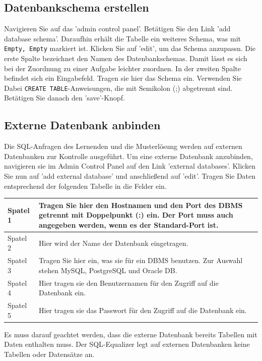 \documentclass[12pt]{scrreprt}
\theoremstyle{remark}
\begin{document}
\subsection{Datenbankschema erstellen}

Navigieren Sie auf das 'admin control panel'. Betätigen Sie den Link 'add database schema'. Daraufhin erhält die Tabelle ein weiteres Schema, was mit \verb|Empty, Empty| markiert ist. Klicken Sie auf 'edit', um das Schema anzupassn. Die erste Spalte bezeichnet den Namen des Datenbankschemas. Damit lässt es sich bei der Zuordnung zu einer Aufgabe leichter zuordnen. In der zweiten Spalte befindet sich ein Eingabefeld. Tragen sie hier das Schema ein. Verwenden Sie Dabei \verb|CREATE TABLE|-Anweisungen, die mit Semikolon (;) abgetrennt sind. Betätigen Sie danach den 'save'-Knopf.

\subsection{Externe Datenbank anbinden}

Die SQL-Anfragen des Lernenden und die Musterlösung werden auf externen Datenbanken zur Kontrolle ausgeführt. Um eine externe Datenbank anzubinden, navigieren sie im Admin Control Panel auf den Link 'external databases'. Klicken Sie nun auf 'add external database' und anschließend auf 'edit'.  Tragen Sie Daten entsprechend der folgenden Tabelle in die Felder ein.

\begin{tabular}{|l|p{14cm}|}\hline
Spatel 1 & Tragen Sie hier den Hostnamen und den Port des DBMS getrennt mit Doppelpunkt (:) ein. Der Port muss auch angegeben werden, wenn es der Standard-Port ist.\\\hline
Spatel 2 & Hier wird der Name der Datenbank eingetragen.\\\hline
Spatel 3 & Tragen Sie hier ein, was sie für ein DBMS benutzen. Zur Auswahl stehen MySQL, PostgreSQL und Oracle DB.\\\hline
Spatel 4 & Hier tragen sie den Benutzernamen für den Zugriff auf die Datenbank ein.\\\hline
Spatel 5 & Hier tragen sie das Passwort für den Zugriff auf die Datenbank ein.\\\hline
\end{tabular}



Es muss darauf geachtet werden, dass die externe Datenbank bereits Tabellen mit Daten enthalten muss. Der SQL-Equalizer legt auf externen Datenbanken keine Tabellen oder Datensätze an.
\end{document}
